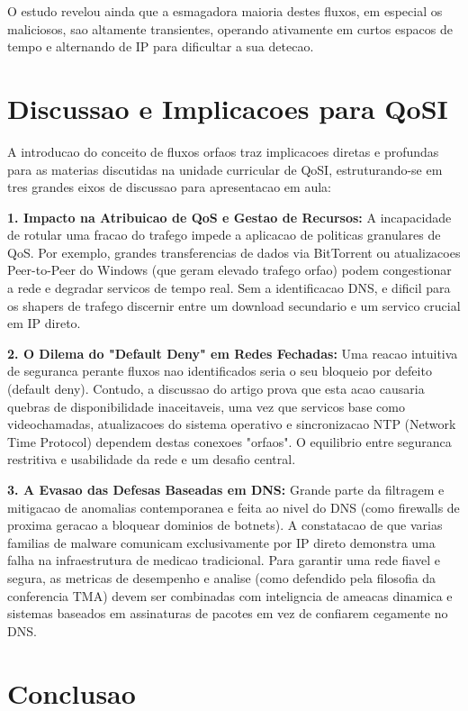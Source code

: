 \documentclass[11pt, a4paper]{article}
\begin{document}
O estudo revelou ainda que a esmagadora maioria destes fluxos, em especial os maliciosos, sao altamente transientes, operando ativamente em curtos espacos de tempo e alternando de IP para dificultar a sua detecao.

\section{Discussao e Implicacoes para QoSI}

A introducao do conceito de fluxos orfaos traz implicacoes diretas e profundas para as materias discutidas na unidade curricular de QoSI, estruturando-se em tres grandes eixos de discussao para apresentacao em aula:

\textbf{1. Impacto na Atribuicao de QoS e Gestao de Recursos:} A incapacidade de rotular uma fracao do trafego impede a aplicacao de politicas granulares de QoS. Por exemplo, grandes transferencias de dados via BitTorrent ou atualizacoes Peer-to-Peer do Windows (que geram elevado trafego orfao) podem congestionar a rede e degradar servicos de tempo real. Sem a identificacao DNS, e dificil para os shapers de trafego discernir entre um download secundario e um servico crucial em IP direto.

\textbf{2. O Dilema do "Default Deny" em Redes Fechadas:} Uma reacao intuitiva de seguranca perante fluxos nao identificados seria o seu bloqueio por defeito (default deny). Contudo, a discussao do artigo prova que esta acao causaria quebras de disponibilidade inaceitaveis, uma vez que servicos base como videochamadas, atualizacoes do sistema operativo e sincronizacao NTP (Network Time Protocol) dependem destas conexoes "orfaos". O equilibrio entre seguranca restritiva e usabilidade da rede e um desafio central.

\textbf{3. A Evasao das Defesas Baseadas em DNS:} Grande parte da filtragem e mitigacao de anomalias contemporanea e feita ao nivel do DNS (como firewalls de proxima geracao a bloquear dominios de botnets). A constatacao de que varias familias de malware comunicam exclusivamente por IP direto demonstra uma falha na infraestrutura de medicao tradicional. Para garantir uma rede fiavel e segura, as metricas de desempenho e analise (como defendido pela filosofia da conferencia TMA) devem ser combinadas com inteligncia de ameacas dinamica e sistemas baseados em assinaturas de pacotes em vez de confiarem cegamente no DNS.

\section{Conclusao}
\end{document}
